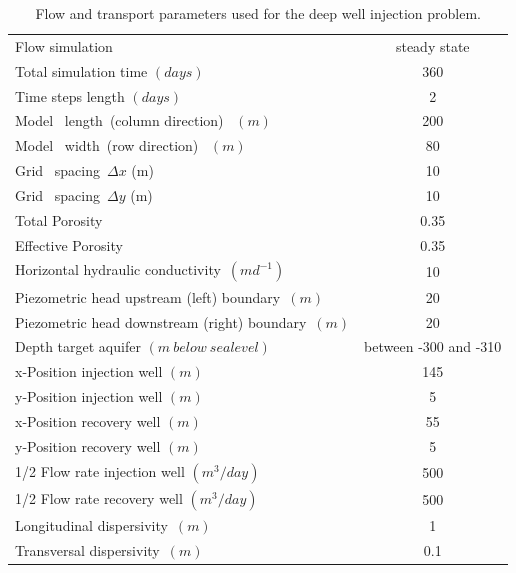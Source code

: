 \begin{table}
\caption{Flow and transport parameters used for the deep well injection problem.}
\begin{center}
\begin{tabular}{lc} \hline
Flow simulation                     & steady state \\
Total simulation time $(days)$       & 360  \\
Time steps length $(days)$       & 2 \\
Model \  length\ (column direction) \ $ (m)      $         &  200            \\
Model \  width\  (row direction) \ $ (m)      $         &   80            \\
Grid \ spacing\ $\Delta x $ (m)                &   10            \\
Grid \ spacing\ $\Delta y $ (m)                &   10            \\
Total Porosity\     $            $         &  0.35           \\
Effective Porosity\     $            $         &  0.35           \\
Horizontal hydraulic conductivity\ $(m d^{-1})           $         &  10         \\  
Piezometric head upstream (left) boundary\ $(m)          $         &  20           \\ 
Piezometric head downstream (right) boundary\ $(m)        $         &  20           \\ 
Depth target aquifer $(m \ below \ sealevel)   $         &  between -300 and -310          \\ 
x-Position injection well $(m)   $         & 145          \\
y-Position injection well $(m)   $         &   5         \\
x-Position recovery well $(m)    $         &  55          \\
y-Position recovery well $(m)    $         &   5         \\
1/2 Flow rate injection well $(m^3/day)   $         &  500         \\
1/2 Flow rate recovery well $(m^3/day)    $         &  500         \\
Longitudinal dispersivity\ $(m)         $         &  1          \\ 
Transversal  dispersivity\ $(m)         $         &  0.1          \\ \hline

\end{tabular}
\label{ex_model_grid}
\end{center}
\end{table}

